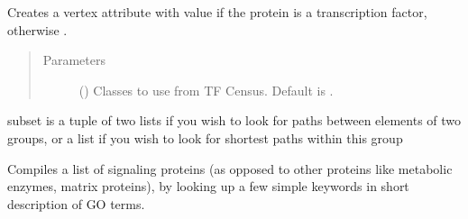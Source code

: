 \documentclass[letterpaper,10pt,english]{sphinxmanual}
\begin{document}
\begin{fulllineitems}
\begin{fulllineitems}
\end{fulllineitems}


\begin{fulllineitems}
\label{\detokenize{main:pypath.main.PyPath.set_transcription_factors}}
Creates a vertex attribute  with value  if
the protein is a transcription factor, otherwise .
\begin{quote}\begin{description}
\item[{Parameters}] \leavevmode
{} () \textendash{} Classes to use from TF Census. Default is \sphinxtitleref{{[}‘a’, ‘b’, ‘other’{]}}.

\end{description}\end{quote}

\end{fulllineitems}


\begin{fulllineitems}
\label{\detokenize{main:pypath.main.PyPath.shortest_path_dist}}
subset is a tuple of two lists if you wish to look for
paths between elements of two groups, or a list if you
wish to look for shortest paths within this group

\end{fulllineitems}


\begin{fulllineitems}
\label{\detokenize{main:pypath.main.PyPath.signaling_proteins_list}}
Compiles a list of signaling proteins (as opposed to other proteins
like metabolic enzymes, matrix proteins), by looking up a few simple
keywords in short description of GO terms.

\end{fulllineitems}


\end{fulllineitems}
\end{document}
